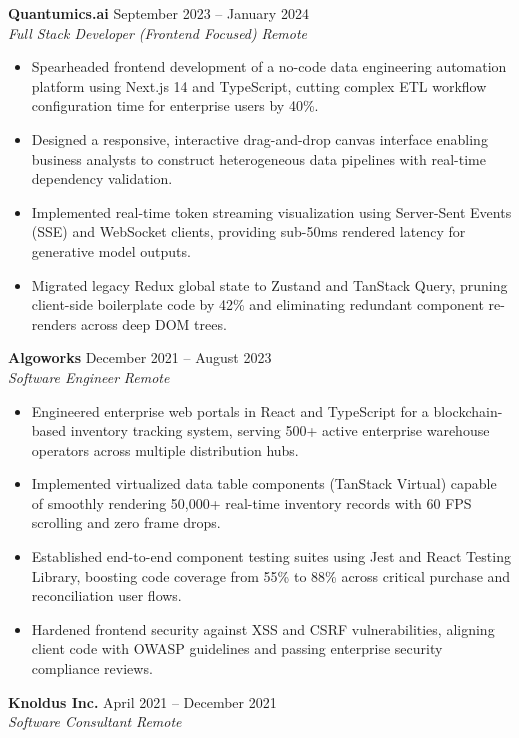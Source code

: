 \documentclass[10pt,a4paper]{article}
\newcommand{\jobheading}[4]{
  \textbf{#1} \hfill #2\\
  \textit{#3} \hfill \textit{#4}\\[-2pt]
}
\begin{document}
\medskip

\jobheading
  {Quantumics.ai}
  {September 2023 -- January 2024}
  {Full Stack Developer (Frontend Focused)}
  {Remote}

\begin{itemize}
  \item Spearheaded frontend development of a no-code data engineering automation platform using Next.js 14 and TypeScript, cutting complex ETL workflow configuration time for enterprise users by 40\%.
  \item Designed a responsive, interactive drag-and-drop canvas interface enabling business analysts to construct heterogeneous data pipelines with real-time dependency validation.
  \item Implemented real-time token streaming visualization using Server-Sent Events (SSE) and WebSocket clients, providing sub-50ms rendered latency for generative model outputs.
  \item Migrated legacy Redux global state to Zustand and TanStack Query, pruning client-side boilerplate code by 42\% and eliminating redundant component re-renders across deep DOM trees.
\end{itemize}

\medskip

\jobheading
  {Algoworks}
  {December 2021 -- August 2023}
  {Software Engineer}
  {Remote}

\begin{itemize}
  \item Engineered enterprise web portals in React and TypeScript for a blockchain-based inventory tracking system, serving 500+ active enterprise warehouse operators across multiple distribution hubs.
  \item Implemented virtualized data table components (TanStack Virtual) capable of smoothly rendering 50,000+ real-time inventory records with 60 FPS scrolling and zero frame drops.
  \item Established end-to-end component testing suites using Jest and React Testing Library, boosting code coverage from 55\% to 88\% across critical purchase and reconciliation user flows.
  \item Hardened frontend security against XSS and CSRF vulnerabilities, aligning client code with OWASP guidelines and passing enterprise security compliance reviews.
\end{itemize}

\medskip

\jobheading
  {Knoldus Inc.}
  {April 2021 -- December 2021}
  {Software Consultant}
  {Remote}
\end{document}
